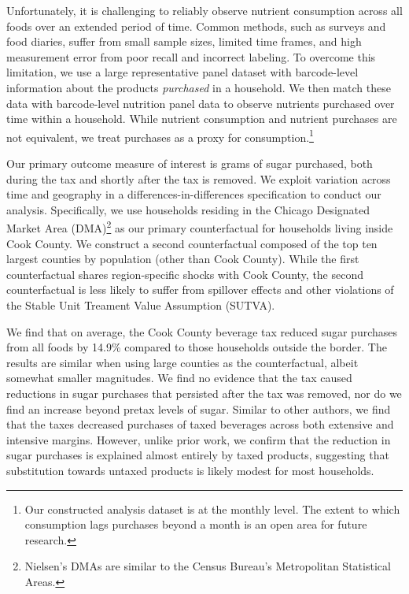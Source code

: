\documentclass[12pt]{article}
\begin{document}
Unfortunately, it is challenging to reliably observe nutrient consumption across all foods over an extended period of time. Common methods, such as surveys and food diaries, suffer from small sample sizes, limited time frames, and high measurement error from poor recall and incorrect labeling. To overcome this limitation, we use a large representative panel dataset with barcode-level information about the products \textit{purchased} in a household. We then match these data with barcode-level nutrition panel data to observe nutrients purchased over time within a household. While nutrient consumption and nutrient purchases are not equivalent, we treat purchases as a proxy for consumption.\footnote{Our constructed analysis dataset is at the monthly level. The extent to which consumption lags purchases beyond a month is an open area for future research.}

Our primary outcome measure of interest is grams of sugar purchased, both during the tax and shortly after the tax is removed. We exploit variation across time and geography in a differences-in-differences specification to conduct our analysis. Specifically, we use households residing in the Chicago Designated Market Area (DMA)\footnote{Nielsen's DMAs are similar to the Census Bureau's Metropolitan Statistical Areas.} as our primary counterfactual for households living inside Cook County. We construct a second counterfactual composed of the top ten largest counties by population (other than Cook County). While the first counterfactual shares region-specific shocks with Cook County, the second counterfactual is less likely to suffer from spillover effects and other violations of the Stable Unit Treament Value Assumption (SUTVA).

We find that on average, the Cook County beverage tax reduced sugar purchases from all foods by 14.9\% compared to those households outside the border. The results are similar when using large counties as the counterfactual, albeit somewhat smaller magnitudes. We find no evidence that the tax caused reductions in sugar purchases that persisted after the tax was removed, nor do we find an increase beyond pretax levels of sugar. Similar to other authors, we find that the taxes decreased purchases of taxed beverages across both extensive and intensive margins. However, unlike prior work, we confirm that the reduction in sugar purchases is explained almost entirely by taxed products, suggesting that substitution towards untaxed products is likely modest for most households.
\end{document}
